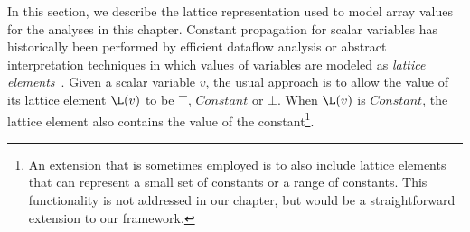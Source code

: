 In this section, we describe the lattice representation used to model
array values for the analyses in this chapter.
Constant propagation for scalar variables has historically been performed
by efficient dataflow analysis
or
abstract interpretation techniques in which values of variables are
modeled as {\it lattice elements}~\cite{Kild73,WeZa91}.
Given a scalar variable $v$,
the usual approach is to allow
the value of its lattice element
$\L(v)$ to be $\top$, $Constant$ or
$\bot$.  When $\L(v)$ is $Constant$, the lattice
element also contains the value of
the constant\footnote{
An extension that is sometimes employed is to also include
lattice elements that can represent a
small set of constants or a range of constants\cite{Harr77}.
This functionality is not addressed in our chapter, but would be
a straightforward extension to our framework.}.

